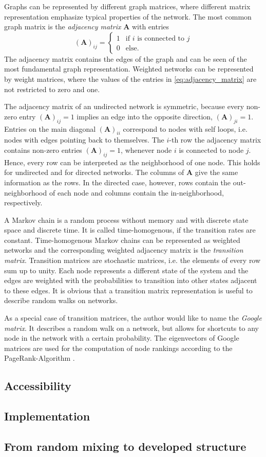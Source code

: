 \documentclass[openright,twoside,headsepline]{scrbook}
\begin{document}
Graphs can be represented by different graph matrices, where different matrix representation emphasize typical properties of the network.
The most common graph matrix is the \emph{adjacency matrix} $\mathbf{A}$ with entries
\begin{equation}\label{eq:adjacency_matrix}
(\mathbf{A})_{ij}= 
\begin{cases}
1 & \text{if $i$ is connected to $j$} \\
0 & \text{else.}
\end{cases} 
\end{equation}
The adjacency matrix contains the edges of the graph and can be seen of the most fundamental graph representation.
Weighted networks can be represented by weight matrices, where the values of the entries in \eqref{eq:adjacency_matrix} are not restricted to zero and one.

The adjacency matrix of an undirected network is symmetric, because every non-zero entry $(\mathbf{A})_{ij}=1$ implies an edge into the opposite direction, $(\mathbf{A})_{ji}=1$.
Entries on the main diagonal $(\mathbf{A})_{ii}$ correspond to nodes with self loops, i.e. nodes with edges pointing back to themselves.
The $i$-th row the adjacency matrix contains non-zero entries $(\mathbf{A})_{ij}=1$, whenever node $i$ is connected to node $j$.
Hence, every row can be interpreted as the neighborhood of one node.
This holds for undirected and for directed networks.
The columns of $\mathbf{A}$ give the same information as the rows.
In the directed case, however, rows contain the out-neighborhood of each node and columns contain the in-neighborhood, respectively.

A Markov chain is a random process without memory and with discrete state space and discrete time.
It is called time-homogenous, if the transition rates are constant.
Time-homogenous Markov chains can be represented as weighted networks and the corresponding weighted adjacency matrix is the \emph{transition matrix}.
Transition matrices are stochastic matrices, i.e. the elements of every row sum up to unity.
Each node represents a different state of the system and the edges are weighted with the probabilities to transition into other states adjacent to these edges.
It is obvious that a transition matrix representation is useful to describe random walks on networks.

As a special case of transition matrices, the author would like to name the \emph{Google matrix}.
It describes a random walk on a network, but allows for shortcuts to any node in the network with a certain probability.
The eigenvectors of Google matrices are used for the computation of node rankings according to the PageRank-Algorithm \cite{PageRank}.



\subsection{Accessibility}

\subsection{Implementation}

\subsection{From random mixing to developed structure}
\end{document}
